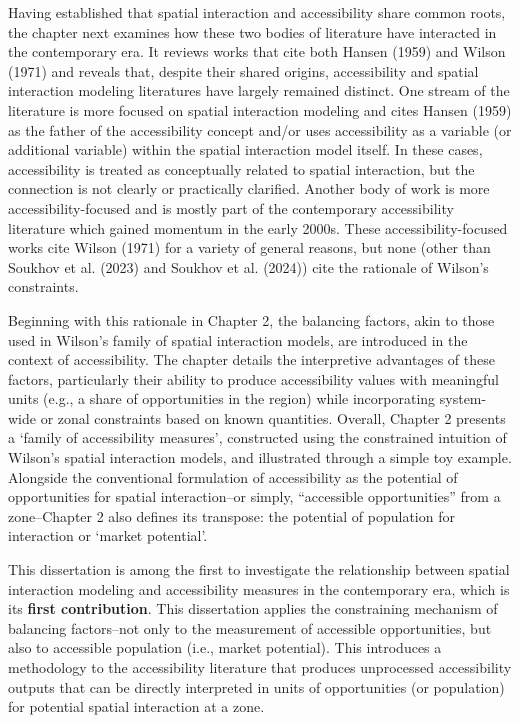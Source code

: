 \documentclass[
11pt, %
oneside, %
english, %
singlespacing, %
]{macthesis} %
\begin{document}
Having established that spatial interaction and accessibility share common roots, the chapter next examines how these two bodies of literature have interacted in the contemporary era. It reviews works that cite both Hansen (1959) and Wilson (1971) and reveals that, despite their shared origins, accessibility and spatial interaction modeling literatures have largely remained distinct. One stream of the literature is more focused on spatial interaction modeling and cites Hansen (1959) as the father of the accessibility concept and/or uses accessibility as a variable (or additional variable) within the spatial interaction model itself. In these cases, accessibility is treated as conceptually related to spatial interaction, but the connection is not clearly or practically clarified. Another body of work is more accessibility-focused and is mostly part of the contemporary accessibility literature which gained momentum in the early 2000s. These accessibility-focused works cite Wilson (1971) for a variety of general reasons, but none (other than Soukhov et al. (2023) and Soukhov et al. (2024)) cite the rationale of Wilson's constraints.

Beginning with this rationale in Chapter 2, the balancing factors, akin to those used in Wilson's family of spatial interaction models, are introduced in the context of accessibility. The chapter details the interpretive advantages of these factors, particularly their ability to produce accessibility values with meaningful units (e.g., a share of opportunities in the region) while incorporating system-wide or zonal constraints based on known quantities. Overall, Chapter 2 presents a `family of accessibility measures', constructed using the constrained intuition of Wilson's spatial interaction models, and illustrated through a simple toy example. Alongside the conventional formulation of accessibility as the potential of opportunities for spatial interaction--or simply, ``accessible opportunities'' from a zone--Chapter 2 also defines its transpose: the potential of population for interaction or `market potential'.

This dissertation is among the first to investigate the relationship between spatial interaction modeling and accessibility measures in the contemporary era, which is its \textbf{first contribution}. This dissertation applies the constraining mechanism of balancing factors--not only to the measurement of accessible opportunities, but also to accessible population (i.e., market potential). This introduces a methodology to the accessibility literature that produces unprocessed accessibility outputs that can be directly interpreted in units of opportunities (or population) for potential spatial interaction at a zone.
\end{document}
